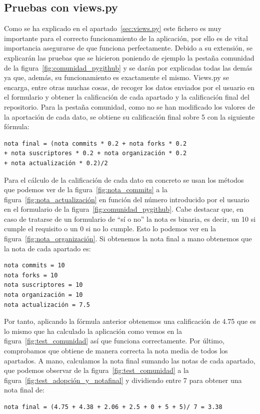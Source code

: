 \documentclass[a4paper, 12pt]{book}
\begin{document}
\subsection{Pruebas con views.py}
Como se ha explicado en el apartado~\ref{sec:views.py} este fichero es muy importante para el correcto funcionamiento de la aplicación, por ello es de vital importancia asegurarse de que funciona perfectamente. Debido a su extensión, se explicarán las pruebas que se hicieron poniendo de ejemplo la pestaña comunidad de la figura~\ref{fig:comunidad_pygithub} y se darán por explicadas todas las demás ya que, además, su funcionamiento es exactamente el mismo.
Views.py se encarga, entre otras muchas cosas, de recoger los datos enviados por el usuario en el formulario y obtener la calificación de cada apartado y la calificación final del repositorio. Para la pestaña comunidad, como no se han modificado los valores de la aportación de cada dato, se obtiene su calificación final sobre 5 con la siguiente fórmula:
\begin{verbatim}
nota final = (nota commits * 0.2 + nota forks * 0.2
+ nota suscriptores * 0.2 + nota organización * 0.2 
+ nota actualización * 0.2)/2
\end{verbatim}
Para el cálculo de la calificación de cada dato en concreto se usan los métodos que podemos ver de la figura~\ref{fig:nota_commits} a la figura~\ref{fig:nota_actualización} en función del número introducido por el usuario en el formulario de la figura~\ref{fig:comunidad_pygithub}. Cabe destacar que, en caso de tratarse de un formulario de ``sí o no'' la nota es binaria, es decir, un 10 si cumple el requisito o un 0 si no lo cumple. Esto lo podemos ver en la figura~\ref{fig:nota_organización}.
Si obtenemos la nota final a mano obtenemos que la nota de cada apartado es:
\begin{verbatim}
nota commits = 10
nota forks = 10
nota suscriptores = 10
nota organización = 10
nota actualización = 7.5
\end{verbatim}
Por tanto, aplicando la fórmula anterior obtenemos una calificación de 4.75 que es lo mismo que ha calculado la aplicación como vemos en la figura~\ref{fig:test_comunidad} así que funciona correctamente. Por último, comprobamos que obtiene de manera correcta la nota media de todos los apartados. A mano, calculamos la nota final sumando las notas de cada apartado, que podemos observar de la figura~\ref{fig:test_comunidad} a la figura~\ref{fig:test_adopción_y_notafinal} y dividiendo entre 7 para obtener una nota final de:
\begin{verbatim}
nota final = (4.75 + 4.38 + 2.06 + 2.5 + 0 + 5 + 5)/ 7 = 3.38
\end{verbatim}
\end{document}
